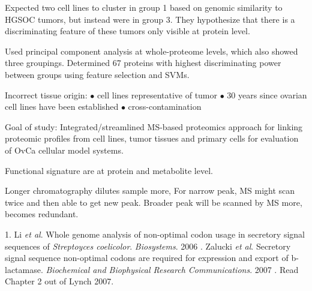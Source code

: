 \documentclass[11pt]{labbook}
\begin{document}
Expected two cell lines to cluster in group 1 based on genomic similarity to HGSOC tumors, but instead were in group 3. They hypothesize that there is a discriminating feature of these tumors only visible at protein level.

Used principal component analysis at whole-proteome levels, which also showed three groupings. Determined 67 proteins with highest discriminating power between groups using feature selection and SVMs. 

Incorrect tissue origin:
$\bullet$ cell lines representative of tumor \newline
$\bullet$ 30 years since ovarian cell lines have been established \newline
$\bullet$ cross-contamination 

Goal of study: Integrated/streamlined MS-based proteomics approach for linking proteomic profiles from cell lines, tumor tissues and primary cells for evaluation of OvCa cellular model systems.

Functional signature are at protein and metabolite level.

Longer chromatography dilutes sample more, For narrow peak, MS might scan twice and then able to get new peak. Broader peak will be scanned by MS more, becomes redundant. 


1. Li \textit{et al}.
Whole genome analysis of non-optimal codon usage in secretory signal sequences of \textit{Streptoyces coelicolor}. \textit{Biosystems}. 2006
. Zalucki \textit{et al}. Secretory signal sequence non-optimal codons are required for expression and export of b-lactamase. \textit{Biochemical and Biophysical Research Communications}. 2007
. Read Chapter 2 out of Lynch 2007.
\let\cleardoublepage\clearpage
\end{document}
